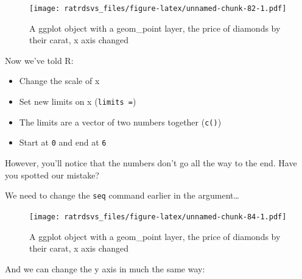 \documentclass[
]{book}
\newenvironment{Shaded}{\begin{snugshade}}{\end{snugshade}}
\newcommand{\DataTypeTok}[1]{\textcolor[rgb]{0.13,0.29,0.53}{#1}}
\newcommand{\DecValTok}[1]{\textcolor[rgb]{0.00,0.00,0.81}{#1}}
\newcommand{\FloatTok}[1]{\textcolor[rgb]{0.00,0.00,0.81}{#1}}
\newcommand{\KeywordTok}[1]{\textcolor[rgb]{0.13,0.29,0.53}{\textbf{#1}}}
\newcommand{\NormalTok}[1]{#1}
\newcommand{\OperatorTok}[1]{\textcolor[rgb]{0.81,0.36,0.00}{\textbf{#1}}}
\newcommand{\StringTok}[1]{\textcolor[rgb]{0.31,0.60,0.02}{#1}}
\begin{document}
\begin{figure}
\centering
\texttt{[image: ratrdsvs\_files/figure-latex/unnamed-chunk-82-1.pdf]}
\caption{\label{fig:unnamed-chunk-82}A ggplot object with a geom\_point layer, the price of diamonds by their carat, x axis changed}
\end{figure}

Now we've told R:

\begin{translate}
\begin{itemize}
\item
  Change the scale of x
\item
  Set new limits on x (\texttt{limits\ =})
\item
  The limits are a vector of two numbers together (\texttt{c()})
\item
  Start at \texttt{0} and end at \texttt{6}
\end{itemize}
\end{translate}

However, you'll notice that the numbers don't go all the way to the end. Have you spotted our mistake?

We need to change the \texttt{seq} command earlier in the argument\ldots{}

\begin{Shaded}
\end{Shaded}

\begin{figure}
\centering
\texttt{[image: ratrdsvs\_files/figure-latex/unnamed-chunk-84-1.pdf]}
\caption{\label{fig:unnamed-chunk-84}A ggplot object with a geom\_point layer, the price of diamonds by their carat, x axis changed}
\end{figure}

And we can change the y axis in much the same way:
\end{document}
